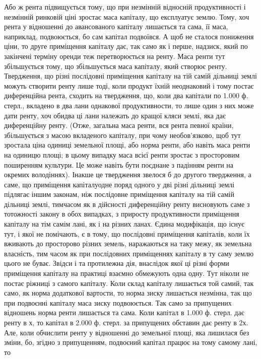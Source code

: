 Або ж рента підвищується тому, що при незмінній відносній продуктивності
і незмінній ринковій ціні зростає маса капіталу, що експлуатує землю.
Тому, хоч рента у відношенні до авансованого капіталу лишається та сама, її
маса, наприклад, подвоюється, бо сам капітал подвоївся. А щоб не сталося
пониження ціни, то друге приміщення капіталу дає, так само як і перше,
надзиск, який по закінчені терміну оренди теж перетворюється на ренту. Маса
ренти тут збільшується тому, що збільшується маса капіталу, який створює
ренту. Твердження, що різні послідовні приміщення капіталу на тій самій дільниці
землі можуть створити ренту лише тоді, коли продукт їхній неоднаковий
і тому постає диференційна рента, сходить на твердження, що, коли два капітали
по \num{1.000} ф. стерл., вкладено в два лани однакової продуктивности, то
лише один з них може дати ренту, хоч обидва ці лани належать до кращої
кляси землі, яка дає диференційну ренту. (Отже, загальна маса ренти, вся
рента певної країни, збільшується з масою вкладеного капіталу, при чому
необов’язково, щоб тут зростала ціна одиниці земельної площі, або норма
ренти, або навіть маса ренти на одиницю площі; в цьому випадку маса
всієї ренти зростає з просторовим поширенням культури. Це може навіть
бути поєднане з падінням ренти на окремих володіннях). Інакше це твердження
звелося б до другого твердження, а саме, що приміщення капіталуодне
поряд одного у дві різні дільниці землі підлягає іншим законам, ніж послідовне
приміщення капіталу на тій самій дільниці землі, тимчасом як в дійсності
диференційну ренту висновують саме з тотожності закону в обох випадках,
з приросту продуктивности приміщення капіталу на тім самім лані, як і на
різних ланах. Єдина модифікація, що існує тут, і якої не помічають, є в тому,
що послідовні приміщення капіталів, коли їх вживають до просторово різних
земель, наражаються на таку межу, як земельна власність, тим часом як при послідовних
приміщеннях капіталу в ту саму землю цього не буває. Звідси і та
протилежна дія, внаслідок якої ці різні форми приміщення капіталу на практиці
взаємно обмежують одна одну. Тут ніколи не постає ріжниці з самого капіталу.
Коли склад капіталу лишається той самий, так само, як норма додаткової
вартости, то норма зиску лишається незмінна, так що при подвоєнні
капіталу маса зиску подвоюється. Так само за припущених відношень норма
ренти лишається та сама. Коли капітал в \num{1.000} ф. стерл. дає ренту в х, то
капітал в \num{2.000} ф. стерл. за припущених обставин дає ренту в 2х. Але, коли
обчислити ренту у відношенні до земельної площі, яка лишилася без зміни, бо,
згідно з припущенням, подвоєний капітал працює на тому самому лані, то
\parbreak{}  %
